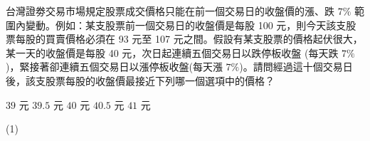 \begin{QUESTIONS}
\begin{QUESTION}
        \begin{QBODY}
            台灣證劵交易市場規定股票成交價格只能在前一個交易日的收盤價的漲、跌 $7\%$ 範圍內變動。例如：某支股票前一個交易日的收盤價是每股 100 元，則今天該支股票每股的買賣價格必須在 93 元至 107 元之間。假設有某支股票的價格起伏很大，某一天的收盤價是每股 40 元，次日起連續五個交易日以跌停板收盤 (每天跌 $7\%$)，緊接著卻連續五個交易日以漲停板收盤(每天漲 $7\%$)。請問經過這十個交易日後，該支股票每股的收盤價最接近下列哪一個選項中的價格？
            \begin{QOPS}
                \QOP $39$ 元
                \QOP $39.5$ 元
                \QOP $40$ 元
                \QOP $40.5$ 元
                \QOP $41$ 元
            \end{QOPS}
        \end{QBODY}
        \begin{QFROMS}
        \end{QFROMS}
        \begin{QTAGS}\end{QTAGS}
        \begin{QANS}
            (1)
        \end{QANS}
        \begin{QSOLLIST}
        \end{QSOLLIST}
        \begin{QEMPTYSPACE}
        \end{QEMPTYSPACE}
    \end{QUESTION}
\end{QUESTIONS}
